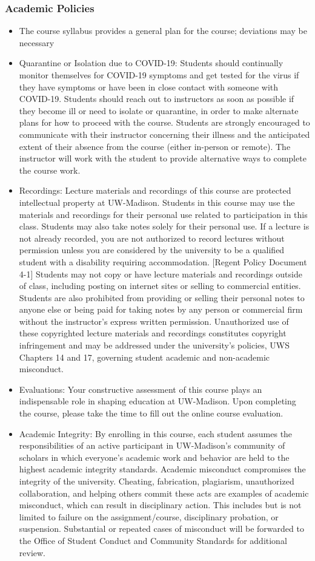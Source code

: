 \documentclass{article}
\begin{document}
\subsubsection*{Academic Policies}
\begin{itemize}
    \item The course syllabus provides a general plan for the course; deviations may be necessary
    \item Quarantine or Isolation due to COVID-19: Students should continually monitor themselves for COVID-19 symptoms and get tested for the virus if they have symptoms or have been in close contact with someone with COVID-19. Students should reach out to instructors as soon as possible if they become ill or need to isolate or quarantine, in order to make alternate plans for how to proceed with the course. Students are strongly encouraged to communicate with their instructor concerning their illness and the anticipated extent of their absence from the course (either in-person or remote). The instructor will work with the student to provide alternative ways to complete the course work.
    \item Recordings: Lecture materials and recordings of this course are protected intellectual property at UW-Madison. Students in this course may use the materials and recordings for their personal use related to participation in this class. Students may also take notes solely for their personal use. If a lecture is not already recorded, you are not authorized to record lectures without permission unless you are considered by the university to be a qualified student with a disability requiring accommodation. [Regent Policy Document 4-1] Students may not copy or have lecture materials and recordings outside of class, including posting on internet sites or selling to commercial entities. Students are also prohibited from providing or selling their personal notes to anyone else or being paid for taking notes by any person or commercial firm without the instructor's express written permission. Unauthorized use of these copyrighted lecture materials and recordings constitutes copyright infringement and may be addressed under the university's policies, UWS Chapters 14 and 17, governing student academic and non-academic misconduct.
    \item Evaluations: Your constructive assessment of this course plays an indispensable role in shaping education at UW-Madison. Upon completing the course, please take the time to fill out the online course evaluation.
    \item Academic Integrity: By enrolling in this course, each student assumes the responsibilities of an active participant in UW-Madison's community of scholars in which everyone's academic work and behavior are held to the highest academic integrity standards. Academic misconduct compromises the integrity of the university. Cheating, fabrication, plagiarism, unauthorized collaboration, and helping others commit these acts are examples of academic misconduct, which can result in disciplinary action. This includes but is not limited to failure on the assignment/course, disciplinary probation, or suspension. Substantial or repeated cases of misconduct will be forwarded to the Office of Student Conduct and Community Standards for additional review.

\end{itemize}
\end{document}
